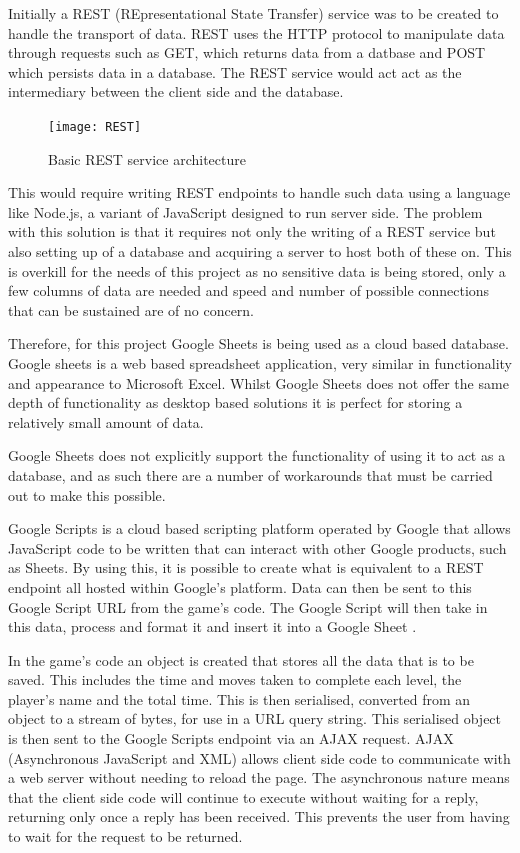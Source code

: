 \documentclass[12pt,a4paper]{report}
\begin{document}
Initially a REST (REpresentational State Transfer) service was to be created to handle the transport of data. REST uses the HTTP protocol to manipulate data through requests such as GET, which returns data from a datbase and POST which persists data in a database. The REST service would act act as the intermediary between the client side and the database.

\begin{figure}[h]
  \centering
  \begin{minipage}[b]{1\textwidth}
    \texttt{[image: REST]}
    \caption{Basic REST service architecture}
  \end{minipage}
\end{figure}
\FloatBarrier

This would require writing REST endpoints to handle such data using a language like Node.js, a variant of JavaScript designed to run server side. The problem with this solution is that it requires not only the writing of a REST service but also setting up of a database and acquiring a server to host both of these on. This is overkill for the needs of this project as no sensitive data is being stored, only a few columns of data are needed and speed and number of possible connections that can be sustained are of no concern.
 
Therefore, for this project Google Sheets is being used as a cloud based database. Google sheets is a web based spreadsheet application, very similar in functionality and appearance to Microsoft Excel. Whilst Google Sheets does not offer the same depth of functionality as desktop based solutions it is perfect for storing a relatively small amount of data.

Google Sheets does not explicitly support the functionality of using it to act as a database, and as such there are a number of workarounds that must be carried out to make this possible.

Google Scripts is a cloud based scripting platform operated by Google that allows JavaScript code to be written that can interact with other Google products, such as Sheets. By using this, it is possible to create what is equivalent to a REST endpoint all hosted within Google's platform. 
Data can then be sent to this Google Script URL from the game's code. The Google Script will then take in this data, process and format it and insert it into a Google Sheet \citep{hawksey_2014}.

In the game's code an object is created that stores all the data that is to be saved. This includes the time and moves taken to complete each level, the player's name and the total time. This is then serialised, converted from an object to a stream of bytes, for use in a URL query string. This serialised object is then sent to the Google Scripts endpoint via an AJAX request. AJAX (Asynchronous JavaScript and XML) allows client side code to communicate with a web server without needing to reload the page. The asynchronous nature means that the client side code will continue to execute without waiting for a reply, returning only once a reply has been received. This prevents the user from having to wait for the request to be returned.
\end{document}
